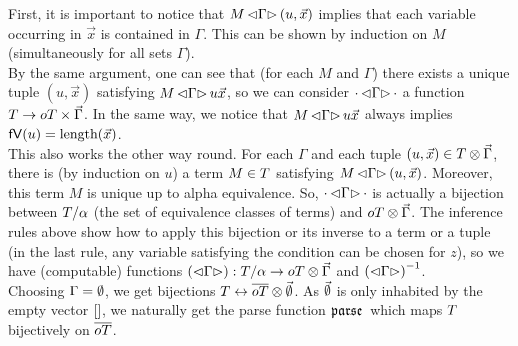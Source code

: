 \documentclass[submission,copyright,creativecommons]{eptcs}
\begin{document}

First, it is important to notice that $M \, { \mathord{\lhd} {\Gamma} \mathord{\rhd} } \, (u, \vec x)$ implies that each variable occurring in $\vec x$ is contained in $\Gamma$. This can be shown by induction on $M$ (simultaneously for all sets $\Gamma$). \\
By the same argument, one can see that (for each $M$ and $\Gamma$) there exists a unique tuple $(u, \vec x)$ satisfying $M \, { \mathord{\lhd} {\Gamma} \mathord{\rhd} } \, u  \vec x$, so we can consider $\cdot \, { \mathord{\lhd} {\Gamma} \mathord{\rhd} } \, \cdot$ a function $T \rightarrow oT \times \vec \Gamma$. In the same way, we notice that $M \, { \mathord{\lhd} {\Gamma} \mathord{\rhd} } \, u  \vec x$ always implies $\mathsf{fV}(u) = \mbox{length}(\vec x)$. \\
This also works the other way round. For each $\Gamma$ and each tuple $(u, \vec x) \in T \otimes \vec \Gamma$, there is (by induction on $u$) a term $M \in T$ satisfying $M \, { \mathord{\lhd} {\Gamma} \mathord{\rhd} } \, (u, \vec x)$. Moreover, this term $M$ is unique up to alpha equivalence. So, $\cdot \, { \mathord{\lhd} {\Gamma} \mathord{\rhd} } \, \cdot$ is actually a bijection between $T / \alpha$ (the set of equivalence classes of terms) and $oT \otimes \vec \Gamma$. The inference rules above show how to apply this bijection or its inverse to a term or a tuple (in the last rule, any variable satisfying the condition can be chosen for $z$), so we have (computable) functions $\left(\mathord{\lhd} {\Gamma} \mathord{\rhd}\right) : T / \alpha \rightarrow oT \otimes \vec \Gamma$ and $\left(\mathord{\lhd} {\Gamma} \mathord{\rhd}\right) ^{-1}$. 
\\
Choosing $\Gamma = \emptyset$, we get bijections $T \leftrightarrow \overline{oT} \otimes {\vec {\emptyset}}$. As $\vec {\emptyset}$ is only inhabited by the empty vector $[]$, we naturally get the parse function $\mathfrak {parse } \,$ which maps $T$ bijectively on $\overline{oT}$.


\end{document}
